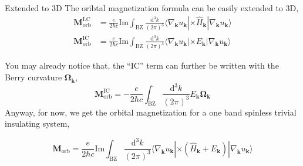 \documentclass{beamer}
\begin{document}
    \begin{frame}{Extended to 3D}
      The oribtal magnetization formula can be easily extended to 3D, 
      \begin{subequations}\begin{align}
        \bm{M}_{\text{orb}}^{\text{LC}} &= \frac{e}{2\hbar{}c}\text{Im}\int_{\text{BZ}}\frac{\mathrm{d}^3k}{(2\pi)^3}\langle\nabla_{\bm{k}}u_{\bm{k}}|\times\widehat{H}_{\bm{k}}|\nabla_{\bm{k}}u_{\bm{k}}\rangle\\
        \bm{M}_{\text{orb}}^{\text{IC}} &= \frac{e}{2\hbar{}c}\text{Im}\int_{\text{BZ}}\frac{\mathrm{d}^3k}{(2\pi)^3}\langle\nabla_{\bm{k}}u_{\bm{k}}|\times{}E_{\bm{k}}|\nabla_{\bm{k}}u_{\bm{k}}\rangle
      \end{align}\end{subequations}
      
      You may already notice that, the ``IC'' term can further be written with the Berry curvature \(\bm{\Omega}_{\bm{k}}\), 
      \begin{equation}
        \bm{M}_{\text{orb}}^{\text{IC}} = -\frac{e}{2\hbar{}c}\int_{\text{BZ}}\frac{\mathrm{d}^3k}{(2\pi)^3}E_{\bm{k}}\bm{\Omega}_{\bm{k}}
      \end{equation}
      Anyway, for now, we get the orbital magnetization for a one band spinless trivial insulating system, 
      \begin{block}{}
        \begin{equation}
          \bm{M}_{\text{orb}} = \frac{e}{2\hbar{}c}\text{Im}\int_{\text{BZ}}\frac{\mathrm{d}^3k}{(2\pi)^3}\langle\nabla_{\bm{k}}u_{\bm{k}}|\times(\widehat{H}_{\bm{k}}+E_{\bm{k}})|\nabla_{\bm{k}}u_{\bm{k}}\rangle
        \end{equation}
      \end{block}
    \end{frame}
\end{document}
